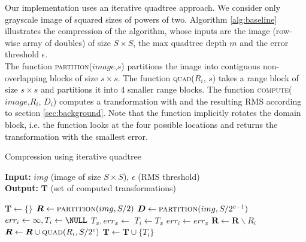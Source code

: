 Our implementation uses an iterative quadtree approach. We consider only grayscale image of squared sizes of powers of two.
Algorithm \ref{alg:baseline} illustrates the compression of the algorithm, whose inputs are the image (row-wise array of doubles) of size $S \times S$, 
the max quadtree depth $m$ and the error threshold $\epsilon$.\\
The function \textsc{partition($image$,$s$)} partitions the image into contiguous non-overlapping blocks of size $s \times s$.
The function \textsc{quad($R_i$, $s$)} takes a range block of size $s \times s$ and partitions it into 4 smaller range blocks.
The function \textsc{compute($image$,$R_i$, $D_i$)} computes a transformation with and the resulting RMS according to section \ref{sec:background}. 
Note that the function implicitly rotates the domain block, i.e. the function looks at the four possible locations and returns the transformation with the smallest error.
\begin{algorithm}
\caption{Compression using iterative quadtree}\label{alg:baseline}
\hspace*{\algorithmicindent} \textbf{Input:} $img$ (image of size $S \times S$), $\epsilon$ (RMS threshold) \\
\hspace*{\algorithmicindent} \textbf{Output:} $\boldsymbol{T}$ (set of computed transformations)
\begin{algorithmic}[1]
  \State $\boldsymbol{T} \gets \{\}$  
  \State $\boldsymbol{R} \gets \Call{partition}{img, S/2}$  
     
        \State $\boldsymbol{D} \gets \Call{partition}{img, S/2^{c-1}}$
            \State $err_i \gets \infty, T_i \gets \NULL$
              \State $T_x, err_x \gets $ 
                \State $T_i \gets T_x$
                \State $err_i \gets err_x$
              \EndIf
            \EndFor
        \EndFor
        \State $\boldsymbol{R} \gets \boldsymbol{R} \backslash  R_i$ 
          \State $\boldsymbol{R} \gets \boldsymbol{R} \cup  \Call{quad}{R_i, S/2^c}$
        \Else
          \State $\boldsymbol{T} \gets \boldsymbol{T} \cup \{T_i\}$
        \EndIf
    \EndFor
\end{algorithmic}
\end{algorithm}

